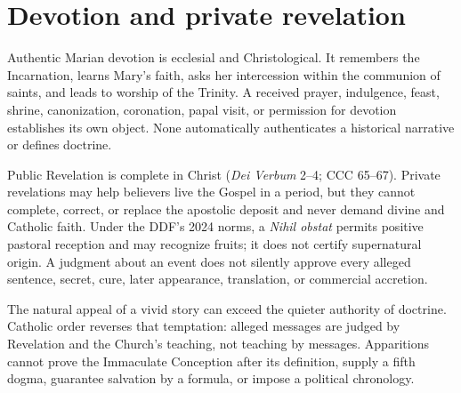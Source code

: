 \section{Devotion and private revelation}

Authentic Marian devotion is ecclesial and Christological. It remembers the
Incarnation, learns Mary's faith, asks her intercession within the communion of
saints, and leads to worship of the Trinity. A received prayer, indulgence,
feast, shrine, canonization, coronation, papal visit, or permission for
devotion establishes its own object. None automatically authenticates a
historical narrative or defines doctrine.

Public Revelation is complete in Christ (\emph{Dei Verbum} 2--4; CCC 65--67).
Private revelations may help believers live the Gospel in a period, but they
cannot complete, correct, or replace the apostolic deposit and never demand
divine and Catholic faith. Under the DDF's 2024 norms, a \emph{Nihil obstat}
permits positive pastoral reception and may recognize fruits; it does not
certify supernatural origin. A judgment about an event does not silently
approve every alleged sentence, secret, cure, later appearance, translation,
or commercial accretion.

The natural appeal of a vivid story can exceed the quieter authority of
doctrine. Catholic order reverses that temptation: alleged messages are judged
by Revelation and the Church's teaching, not teaching by messages. Apparitions
cannot prove the Immaculate Conception after its definition, supply a fifth
dogma, guarantee salvation by a formula, or impose a political chronology.

